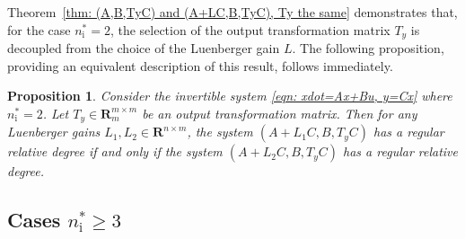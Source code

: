 \documentclass[sort&compress]{elsarticle}
\newtheorem{prop}{Proposition}
\newcommand\nsharp{n_\mathrm i^*}
\newcommand\Qi{Q_\mathrm i}
\newcommand\Qoc{Q_\mathrm{oc}}
\newcommand\rank{\mathrm{rank}}
\newcommand\R{\mathbf R}
\begin{document}

Theorem~\ref{thm: (A,B,TyC) and (A+LC,B,TyC), Ty the same} demonstrates that, for the case $\nsharp=2$,
the selection of the output transformation
matrix $T_y$ is decoupled from
the choice of the Luenberger gain $L$.
The following proposition, providing an equivalent description of
this result, follows immediately.

\begin{prop}\label{thm: nsharp=2 Ty L no}
Consider the invertible system \eqref{eqn: xdot=Ax+Bu, y=Cx}
where $\nsharp=2$.
Let $T_y\in\R^{m\times m}_m$ be an output transformation matrix.
Then for any Luenberger gains $L_1,L_2\in\R^{n\times m}$,
the system $(A+L_1C,B,T_yC)$ has a regular relative degree
if and only if
the system $(A+L_2C,B,T_yC)$ has a regular relative degree.
\end{prop}

\subsection{Cases $\nsharp \ge 3$}
\end{document}
